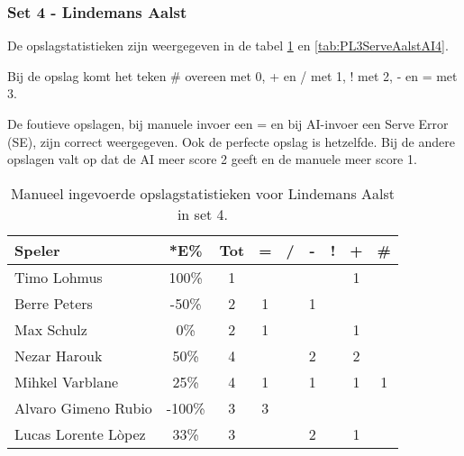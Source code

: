 \subsubsection{Set 4 - Lindemans Aalst}
\label{sec:PL3_Aalst4}

De opslagstatistieken zijn weergegeven in de tabel \ref{tab:PL3ServeAalstMan4} en \ref{tab:PL3ServeAalstAI4}. 

Bij de opslag komt het teken \# overeen met 0, + en / met 1, ! met 2, - en = met 3.

De foutieve opslagen, bij manuele invoer een = en bij AI-invoer een Serve Error (SE), zijn correct weergegeven.  Ook de perfecte opslag is hetzelfde. Bij de andere opslagen valt op dat de AI meer score 2 geeft en de manuele meer score 1.

\begin{table}[ht!]
    \centering
    \scriptsize
    \begin{tabular}{|l|c|c|c|c|c|c|c|c|}
        \hline
        \textbf{Speler} & *E\% & Tot & = & / & - & ! & + & \# \\ \hline
        Timo Lohmus & 100\% & 1 &  &  & & & 1 &  \\
        Berre Peters & -50\% & 2 & 1 &  & 1 &  & & \\ 
        Max Schulz & 0\% & 2 & 1 &  &  &  & 1 &\\ 
        Nezar Harouk & 50\% & 4 &  &  & 2 & & 2 &  \\ 
        Mihkel Varblane & 25\% & 4 & 1 &  & 1 &  & 1 & 1\\
        Alvaro Gimeno Rubio & -100\% & 3 & 3 &  &  &  &  & \\ 
        Lucas Lorente Lòpez & 33\% & 3 &  &  & 2 & & 1 &  \\ \hline
    \end{tabular}
    \caption[Manueel ingevoerde opslagstatistieken voor Lindemans Aalst in set 4]{\label{tab:PL3ServeAalstMan4}Manueel ingevoerde opslagstatistieken voor Lindemans Aalst in set 4.}
\end{table}

